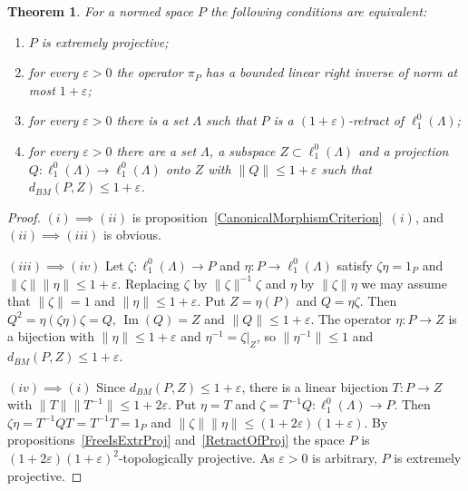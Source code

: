 \documentclass[12pt]{article}
\newtheorem{theorem}{Theorem}[section]
\newcommand{\lo}[1]{\ell_1^0(#1)}
\newcommand{\norm}[1]{\lVert #1\rVert}
\renewcommand{\Im}{\operatorname{Im}}
\newcommand{\BM}{d_{BM}}
\begin{document}
\begin{theorem}\label{ExtrProjCriterion} For a normed space $P$ the following
    conditions are equivalent:
    \begin{enumerate}[label = (\roman*)]
        \item $P$ is extremely projective;
        \item for every $\varepsilon>0$ the operator $\pi_P$ has a bounded linear right
              inverse of norm at most $1+\varepsilon$;
        \item for every $\varepsilon>0$ there is a set $\Lambda$ such that $P$
              is a $(1+\varepsilon)$-retract of $\lo{\Lambda}$;
        \item for every $\varepsilon>0$ there are a set $\Lambda$, a subspace
              $Z\subset\lo{\Lambda}$ and a projection $Q:\lo{\Lambda}\to\lo{\Lambda}$
              onto $Z$ with $\norm{Q}\leq 1+\varepsilon$ such that
              $\BM(P,Z)\leq 1+\varepsilon$.
    \end{enumerate}
\end{theorem}
\begin{proof} $(i)\implies(ii)$ is proposition~\ref{CanonicalMorphismCriterion}~$(i)$,
    and $(ii)\implies(iii)$ is obvious.

    $(iii)\implies(iv)$ Let $\zeta:\lo{\Lambda}\to P$ and $\eta:P\to\lo{\Lambda}$
    satisfy $\zeta\eta=1_P$ and $\norm{\zeta}\norm{\eta}\leq 1+\varepsilon$. Replacing
    $\zeta$ by $\norm{\zeta}^{-1}\zeta$ and $\eta$ by $\norm{\zeta}\eta$ we may
    assume that $\norm{\zeta}=1$ and $\norm{\eta}\leq 1+\varepsilon$. Put
    $Z=\eta(P)$ and $Q=\eta\zeta$. Then $Q^2=\eta(\zeta\eta)\zeta=Q$,
    $\Im(Q)=Z$ and $\norm{Q}\leq 1+\varepsilon$. The operator $\eta:P\to Z$
    is a bijection with $\norm{\eta}\leq 1+\varepsilon$ and
    $\eta^{-1}=\zeta|_Z$, so $\norm{\eta^{-1}}\leq 1$ and
    $\BM(P,Z)\leq 1+\varepsilon$.

    $(iv)\implies(i)$ Since $\BM(P,Z)\leq 1+\varepsilon$, there is a linear
    bijection $T:P\to Z$ with $\norm{T}\norm{T^{-1}}\leq 1+2\varepsilon$. Put
    $\eta=T$ and $\zeta=T^{-1}Q:\lo{\Lambda}\to P$. Then
    $\zeta\eta=T^{-1}QT=T^{-1}T=1_P$ and
    $\norm{\zeta}\norm{\eta}\leq(1+2\varepsilon)(1+\varepsilon)$. By
    propositions~\ref{FreeIsExtrProj} and~\ref{RetractOfProj} the space $P$ is
    $(1+2\varepsilon)(1+\varepsilon)^2$-topologically projective. As
    $\varepsilon>0$ is arbitrary, $P$ is extremely projective.
\end{proof}
\end{document}
